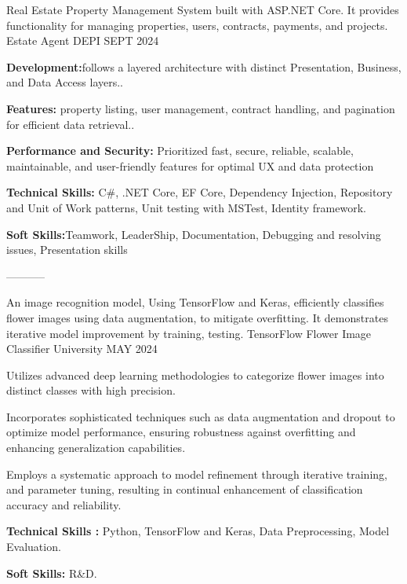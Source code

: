 \begin{cventries}
\cventry
    {Real Estate Property Management System built with ASP.NET Core. It provides functionality for managing properties, users, contracts, payments, and projects.
    } %
    {Estate Agent } %
    {DEPI} %
    {SEPT 2024} %
    {
      \begin{cvitems} %
        \item \textbf{Development:}{follows a layered architecture with distinct Presentation, Business, and Data Access layers..}
        \item \textbf{Features:}{ property listing, user management, contract handling, and pagination for efficient data retrieval..}
        \item \textbf{Performance and Security:}{ Prioritized fast, secure, reliable, scalable, maintainable, and user-friendly features for optimal UX and data protection}
        \item \textbf{Technical Skills:}{ C\#, .NET Core, EF Core, Dependency Injection, Repository and Unit of Work patterns, Unit testing with MSTest, Identity framework.}
        \item \textbf{Soft Skills:}{Teamwork, LeaderShip, Documentation, Debugging and resolving issues, Presentation skills}
      \end{cvitems}
    }
    
    \begin{singlespace}
-----------
\end{singlespace}

  \cventry
    {An image recognition model, Using TensorFlow and Keras, efficiently classifies flower images using data augmentation, to mitigate overfitting. It demonstrates iterative model improvement by training, testing.
    } %
    {TensorFlow Flower Image Classifier} %
    {University} %
    {MAY 2024} %
    {
      \begin{cvitems} %
        \item {Utilizes advanced deep learning methodologies to categorize flower images into distinct classes with high precision.}
        \item {Incorporates sophisticated techniques such as data augmentation and dropout to optimize model performance, ensuring robustness against overfitting and enhancing generalization capabilities.}
        \item {Employs a systematic approach to model refinement through iterative training, and parameter tuning, resulting in continual enhancement of classification accuracy and reliability.}
        \item \textbf{Technical Skills :}{ Python, TensorFlow and Keras, Data Preprocessing, Model Evaluation. }
        \item \textbf{Soft Skills: }{R\&D.}
      \end{cvitems}
    }
\end{cventries}  

